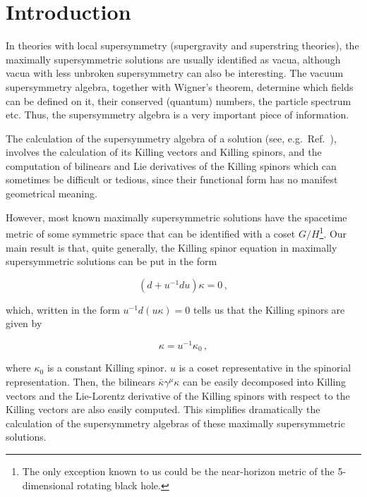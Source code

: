 \documentclass[12pt,a4paper]{article}
\begin{document}
\newpage

\pagestyle{plain}


\section*{Introduction}

In theories with local supersymmetry (supergravity and superstring
theories), the maximally supersymmetric solutions are usually
identified as vacua, although vacua with less unbroken supersymmetry
can also be interesting. The vacuum supersymmetry algebra, together
with Wigner's theorem, determine which fields can be defined on it,
their conserved (quantum) numbers, the particle spectrum etc. Thus,
the supersymmetry algebra is a very important piece of information.

The calculation of the supersymmetry algebra of a solution (see,
e.g.~Ref.~\cite{Figueroa-O'Farrill:1999va}), involves the calculation
of its Killing vectors and Killing spinors, and the computation of
bilinears and Lie derivatives of the Killing spinors which can
sometimes be difficult or tedious, since their functional form has no
manifest geometrical meaning.

However, most known maximally supersymmetric solutions have the
spacetime metric of some symmetric space that can be identified with a
coset $G/H$\footnote{The only exception known to us could be the
  near-horizon metric of the 5-dimensional rotating black hole.}.  Our
main result is that, quite generally, the Killing spinor equation in
maximally supersymmetric solutions can be put in the form

\begin{equation}
\label{eq:KSEu}
(d +u^{-1} du)\kappa=0\, , 
\end{equation}

\noindent 
which, written in the form $u^{-1}d(u\kappa)=0$ tells us that the
Killing spinors are given by 

\begin{equation}
\kappa = u^{-1}\kappa_{0}\, ,  
\end{equation}

\noindent
where $\kappa_{0}$ is a constant Killing spinor. $u$ is a coset
representative in the spinorial representation.  Then, the bilinears
$\bar{\kappa}\gamma^{\mu}\kappa$ can be easily decomposed into Killing
vectors and the Lie-Lorentz derivative of the Killing spinors with
respect to the Killing vectors are also easily computed. This
simplifies dramatically the calculation of the supersymmetry algebras
of these maximally supersymmetric solutions.
\end{document}
